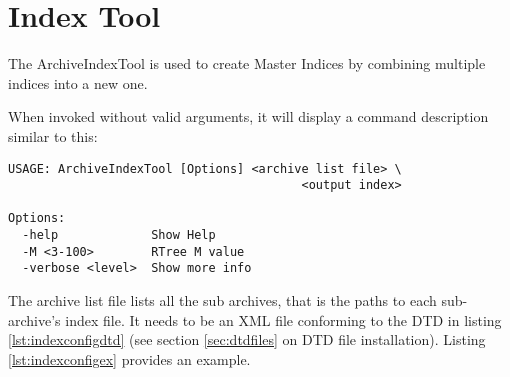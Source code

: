 \section{Index Tool}
The ArchiveIndexTool is used to create Master Indices by combining
multiple indices into a new one.

When invoked without valid arguments, it will display a command
description similar to this:

\begin{lstlisting}[frame=none,keywordstyle=\sffamily]
USAGE: ArchiveIndexTool [Options] <archive list file> \
                                         <output index>
 
Options:
  -help             Show Help
  -M <3-100>        RTree M value
  -verbose <level>  Show more info
\end{lstlisting}

\noindent The archive list file lists all the sub archives,
that is the paths to each sub-archive's index file. It needs to be an
XML file conforming to the DTD in listing \ref{lst:indexconfigdtd}
(see section \ref{sec:dtdfiles} on DTD file installation).
Listing \ref{lst:indexconfigex} provides an example.



